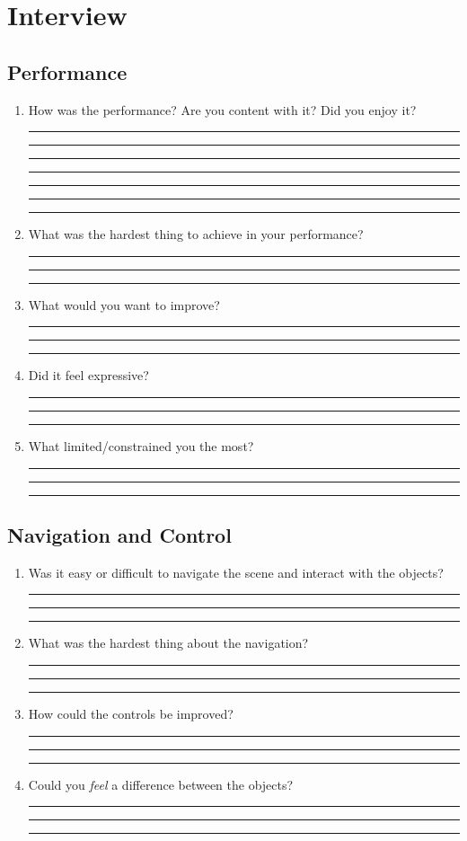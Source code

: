 \documentclass[10pt,a4paper]{scrartcl}
\begin{document}
\section{Interview}
\subsection{Performance}
\begin{enumerate}
\item How was the performance? Are you content with it? Did you enjoy it?\\
\rule{\linewidth}{0.25pt}
\rule{\linewidth}{0.25pt}
\rule{\linewidth}{0.25pt}
\rule{\linewidth}{0.25pt}
\rule{\linewidth}{0.25pt}
\rule{\linewidth}{0.25pt}
\rule{\linewidth}{0.25pt}

\item What was the hardest thing to achieve in your performance?\\
\rule{\linewidth}{0.25pt}
\rule{\linewidth}{0.25pt}
\rule{\linewidth}{0.25pt}

\item What would you want to improve?\\
\rule{\linewidth}{0.25pt}
\rule{\linewidth}{0.25pt}
\rule{\linewidth}{0.25pt}

\item Did it feel expressive?\\
\rule{\linewidth}{0.25pt}
\rule{\linewidth}{0.25pt}
\rule{\linewidth}{0.25pt}

\item What limited/constrained you the most?\\
\rule{\linewidth}{0.25pt}
\rule{\linewidth}{0.25pt}
\rule{\linewidth}{0.25pt}

\end{enumerate}
\subsection{Navigation and Control}
\begin{enumerate}
\item Was it easy or difficult to navigate the scene and interact with the objects?\\
\rule{\linewidth}{0.25pt}
\rule{\linewidth}{0.25pt}
\rule{\linewidth}{0.25pt}

\item What was the hardest thing about the navigation?\\
\rule{\linewidth}{0.25pt}
\rule{\linewidth}{0.25pt}
\rule{\linewidth}{0.25pt}

\item How could the controls be improved?\\
\rule{\linewidth}{0.25pt}
\rule{\linewidth}{0.25pt}
\rule{\linewidth}{0.25pt}




\item Could you \emph{feel} a difference between the objects?\\
\rule{\linewidth}{0.25pt}
\rule{\linewidth}{0.25pt}
\rule{\linewidth}{0.25pt}

\end{enumerate}
\end{document}
